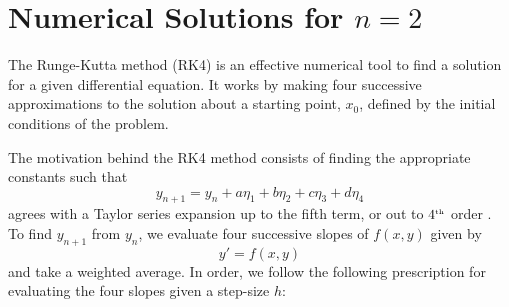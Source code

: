 \documentclass[12pt, manuscript]{article}
\begin{document}
\section*{Numerical Solutions for $n = 2$}
The Runge-Kutta method (RK4) is an effective numerical tool to
find a solution for a given differential equation. It works by making four successive approximations to the solution about a starting point, $x_{0}$, defined by the initial conditions of the problem.\par
The motivation behind the RK4 method consists of finding the appropriate constants such that 
    \begin{equation}
        y_{n+1} = y_n + a\eta_1 + b\eta_2 + c\eta_3 + d\eta_4
    \end{equation}
    agrees with a Taylor series expansion up to the fifth term, or out to $4^{\text{\tiny{th}}}$ order \cite{zill}. To find $y_{n+1}$ from $y_n$, we evaluate four successive slopes of $f(x, y)$ given by
    \begin{equation}
        y' = f(x, y)
    \end{equation}
    and take a weighted average. In order, we follow the following prescription \cite{blanch} for evaluating the four slopes given a step-size $h$:
\end{document}
